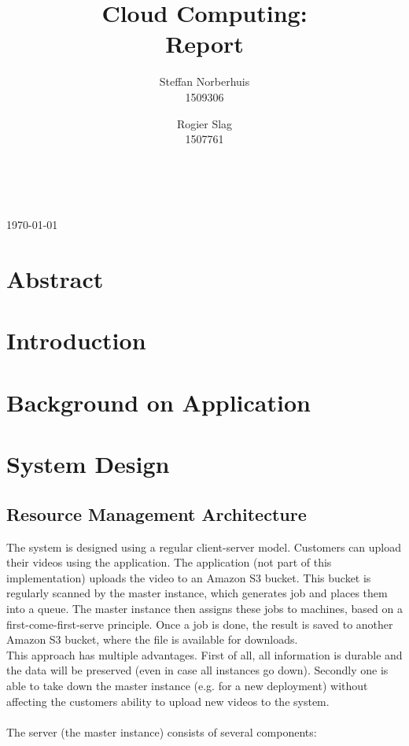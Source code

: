 \documentclass[a4paper]{IEEEtran}
\title{Cloud Computing: \\ Report}
\author{Steffan Norberhuis\\ 1509306 \and
 Rogier Slag\\ 1507761}
\author{
    \IEEEauthorblockN{Steffan Norberhuis, Rogier Slag}\\
    \IEEEauthorblockA{1509306, 1507761}
}
\begin{document}
\maketitle
\begin{center}
\today
\end{center}

\section{Abstract}


\section{Introduction}




\section{Background on Application}

\section{System Design}

\subsection{Resource Management Architecture}

The system is designed using a regular client-server model.
Customers can upload their videos using the application.
The application (not part of this implementation) uploads the video to an Amazon S3 bucket.
This bucket is regularly scanned by the master instance, which generates job and places them into a queue.
The master instance then assigns these jobs to machines, based on a first-come-first-serve principle.
Once a job is done, the result is saved to another Amazon S3 bucket, where the file is available for downloads.
\\
This approach has multiple advantages.
First of all, all information is durable and the data will be preserved (even in case all instances go down).
Secondly one is able to take down the master instance (e.g. for a new deployment) without affecting the customers ability to upload new videos to the system.
\\
\\
The server (the master instance) consists of several components:
\end{document}
